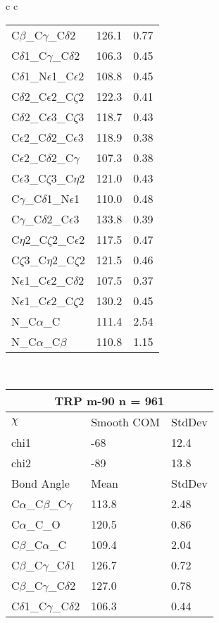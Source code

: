 \begin{longtable}{ c c }
\begin{tabular}{ l l l }
  C$\beta$\_C$\gamma$\_C$\delta$2 & 126.1 & 0.77\\
  C$\delta$1\_C$\gamma$\_C$\delta$2 & 106.3 & 0.45\\
  C$\delta$1\_N$\epsilon$1\_C$\epsilon$2 & 108.8 & 0.45\\
  C$\delta$2\_C$\epsilon$2\_C$\zeta$2 & 122.3 & 0.41\\
  C$\delta$2\_C$\epsilon$3\_C$\zeta$3 & 118.7 & 0.43\\
  C$\epsilon$2\_C$\delta$2\_C$\epsilon$3 & 118.9 & 0.38\\
  C$\epsilon$2\_C$\delta$2\_C$\gamma$ & 107.3 & 0.38\\
  C$\epsilon$3\_C$\zeta$3\_C$\eta$2 & 121.0 & 0.43\\
  C$\gamma$\_C$\delta$1\_N$\epsilon$1 & 110.0 & 0.48\\
  C$\gamma$\_C$\delta$2\_C$\epsilon$3 & 133.8 & 0.39\\
  C$\eta$2\_C$\zeta$2\_C$\epsilon$2 & 117.5 & 0.47\\
  C$\zeta$3\_C$\eta$2\_C$\zeta$2 & 121.5 & 0.46\\
  N$\epsilon$1\_C$\epsilon$2\_C$\delta$2 & 107.5 & 0.37\\
  N$\epsilon$1\_C$\epsilon$2\_C$\zeta$2 & 130.2 & 0.45\\
  N\_C$\alpha$\_C & 111.4 & 2.54\\
  N\_C$\alpha$\_C$\beta$ & 110.8 & 1.15\\
  \bottomrule
  \end{tabular}
  \\
  \begin{tabular}{ l l l }
  \toprule
  \multicolumn{3}{c}{TRP \textbf{m-90} n = 961} \\ \toprule
  $\chi$       & Smooth COM & StdDev \\ \midrule
  chi1 & -68 & 12.4 \\ 
  chi2 & -89 & 13.8 \\ \midrule
  Bond Angle   & Mean     & StdDev \\ \midrule
  C$\alpha$\_C$\beta$\_C$\gamma$ & 113.8 & 2.48\\
  C$\alpha$\_C\_O & 120.5 & 0.86\\
  C$\beta$\_C$\alpha$\_C & 109.4 & 2.04\\
  C$\beta$\_C$\gamma$\_C$\delta$1 & 126.7 & 0.72\\
  C$\beta$\_C$\gamma$\_C$\delta$2 & 127.0 & 0.78\\
  C$\delta$1\_C$\gamma$\_C$\delta$2 & 106.3 & 0.44\\

\end{tabular}
\end{longtable}
